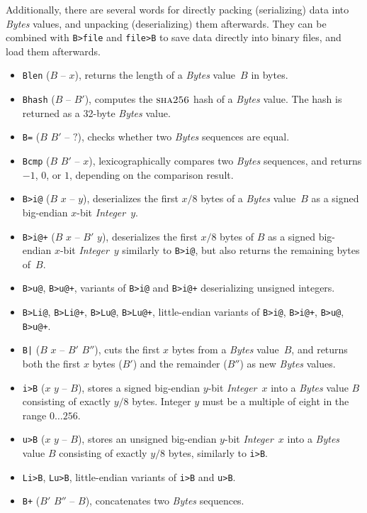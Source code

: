 \documentclass[12pt,oneside]{article}
\def\opsc#1{\operatorname{\textsc{#1}}}
\def\Sha{\opsc{sha256}}
\begin{document}
Additionally, there are several words for directly packing (serializing) data into {\em Bytes\/} values, and unpacking (deserializing) them afterwards. They can be combined with {\tt B>file} and {\tt file>B} to save data directly into binary files, and load them afterwards.
\begin{itemize}
\item {\tt Blen} ($B$ -- $x$), returns the length of a {\em Bytes\/} value~$B$ in bytes.
\item {\tt Bhash} ($B$ -- $B'$), computes the $\Sha$ hash of a {\em Bytes\/} value. The hash is returned as a 32-byte {\em Bytes\/} value.
\item {\tt B=} ($B$ $B'$ -- $?$), checks whether two {\em Bytes\/} sequences are equal.
\item {\tt Bcmp} ($B$ $B'$ -- $x$), lexicographically compares two {\em Bytes\/} sequences, and returns $-1$, $0$, or $1$, depending on the comparison result.
\item {\tt B>i@} ($B$ $x$ -- $y$), deserializes the first $x/8$ bytes of a {\em Bytes} value~$B$ as a signed big-endian $x$-bit {\em Integer}~$y$.
\item {\tt B>i@+} ($B$ $x$ -- $B'$ $y$), deserializes the first $x/8$ bytes of $B$ as a signed big-endian $x$-bit {\em Integer}~$y$ similarly to {\tt B>i@}, but also returns the remaining bytes of~$B$.
\item {\tt B>u@}, {\tt B>u@+}, variants of {\tt B>i@} and {\tt B>i@+} deserializing unsigned integers.
\item {\tt B>Li@}, {\tt B>Li@+}, {\tt B>Lu@}, {\tt B>Lu@+}, little-endian variants of {\tt B>i@}, {\tt B>i@+}, {\tt B>u@}, {\tt B>u@+}.
\item {\tt B|} ($B$ $x$ -- $B'$ $B''$), cuts the first $x$ bytes from a {\em Bytes} value~$B$, and returns both the first $x$ bytes ($B'$) and the remainder ($B''$) as new {\em Bytes} values.
\item {\tt i>B} ($x$ $y$ -- $B$), stores a signed big-endian $y$-bit {\em Integer}~$x$ into a {\em Bytes} value $B$ consisting of exactly $y/8$ bytes. Integer $y$ must be a multiple of eight in the range $0\ldots256$.
\item {\tt u>B} ($x$ $y$ -- $B$), stores an unsigned big-endian $y$-bit {\em Integer}~$x$ into a {\em Bytes} value $B$ consisting of exactly $y/8$ bytes, similarly to {\tt i>B}.
\item {\tt Li>B}, {\tt Lu>B}, little-endian variants of {\tt i>B} and {\tt u>B}.
\item {\tt B+} ($B'$ $B''$ -- $B$), concatenates two {\em Bytes\/} sequences.
\end{itemize}
\end{document}
